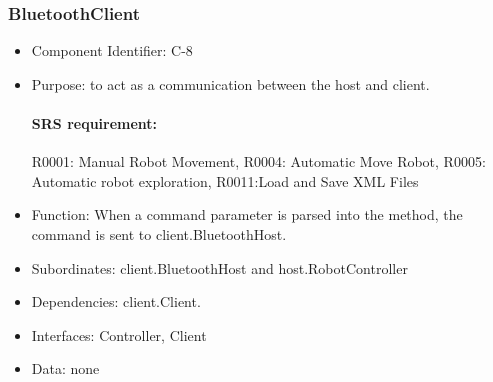 \documentclass[11pt, a4paper]{report}
\begin{document}
\subsubsection{BluetoothClient}
\begin{itemize}
\item Component Identifier: C-8
\item Purpose: to act as a communication between the host and client.
\paragraph{SRS requirement:}R0001: Manual Robot Movement, R0004: Automatic Move Robot,
R0005: Automatic robot exploration, R0011:Load and Save XML Files
\item Function: When a command parameter is parsed into the method, the command is sent to
client.BluetoothHost.
\item Subordinates: client.BluetoothHost and host.RobotController
\item Dependencies: client.Client.
\item Interfaces: Controller, Client
\item Data: none
\end{itemize}
\end{document}
